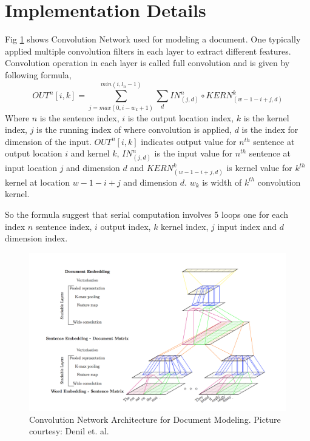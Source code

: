 \documentclass{article}
\begin{document}
\section*{Implementation Details}
 Fig \ref{fig:convnet} shows Convolution Network used for modeling a document. One typically applied multiple convolution filters in each layer to extract different features. Convolution operation in each layer is called full convolution and is given by following formula,
 \[  
 OUT^n[i, k] = \sum_{j = max(0, i-w_k+1)}^{min(i, l_n-1)} \sum_d IN^n_{(j, d)} \circ KERN_{(w-1-i+j, d)}^k
 \]
Where $n$ is the sentence index, $i$ is the output location index, $k$ is the kernel index, $j$ is the running index of where convolution is applied,  $d$ is the index for dimension of the input.  $OUT^n[i, k]$ indicates output value for $n^{th}$ sentence at output location $i$ and kernel $k$, $IN^n_{(j, d)}$ is the input value for $n^{th}$ sentence at input location $j$ and dimension $d$ and $KERN_{(w-1-i+j, d)}^k$ is kernel value for $k^{th}$ kernel at location $w-1-i+j$ and dimension $d$. $w_k$ is width of $k^{th}$ convolution kernel.

So the formula suggest that serial computation involves 5 loops one for each index $n$ sentence index, $i$ output index, $k$ kernel index, $j$ input index and $d$ dimension index. 

 \begin{figure}[!htbp]
\begin{center}
\includegraphics[scale=0.35]{document_model.png}
\end{center}
\caption{Convolution Network Architecture for Document Modeling. Picture courtesy: Denil et. al. \cite{Denil2014c} }
\label{fig:convnet}
\end{figure}
\end{document}
